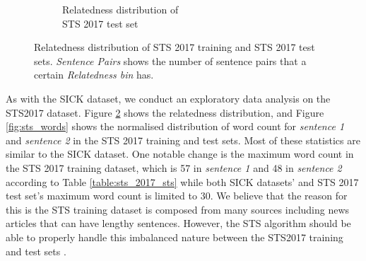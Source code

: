 \begin{enumerate}
\begin{figure}
\begin{subfigure}[b]{.5\textwidth}
		\caption{Relatedness distribution of \\ STS 2017 test set}
		\label{fig:sts_test_relatedness}
	\end{subfigure}
	\caption[Relatedness distribution of STS 2017 training and STS 2017 test sets]{Relatedness distribution of STS 2017 training and STS 2017 test sets. \textit{Sentence Pairs} shows the number of sentence pairs that a certain \textit{Relatedness bin} has.}
	\label{fig:sts_relatedness}
\end{figure}

As with the SICK dataset, we conduct an exploratory data analysis on the STS2017 dataset. Figure \ref{fig:sts_relatedness} shows the relatedness distribution, and Figure \ref{fig:sts_words} shows the normalised distribution of word count for \emph{sentence 1} and \emph{sentence 2} in the STS 2017 training and test sets. Most of these statistics are similar to the SICK dataset. One notable change is the maximum word count in the STS 2017 training dataset, which is 57 in \emph{sentence 1} and 48 in \emph{sentence 2} according to Table \ref{table:sts_2017_sts} while both SICK datasets' and STS 2017 test set's maximum word count is limited to 30. We believe that the reason for this is the STS training dataset is composed from many sources including news articles that can have lengthy sentences. However, the STS algorithm should be able to properly handle this imbalanced nature between the STS2017 training and test sets \autocite{cer-etal-2017-semeval}. 


\end{enumerate}
